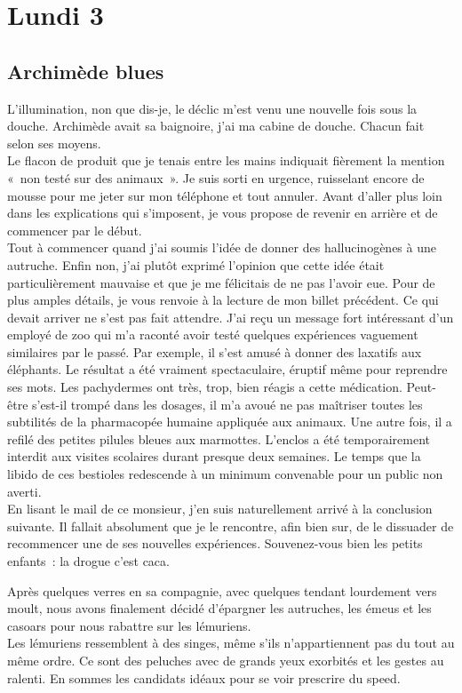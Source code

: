﻿\section*{Lundi 3}
\subsection*{Archimède blues}
L’illumination, non que dis-je, le déclic m’est venu une nouvelle fois sous la douche. Archimède avait sa baignoire, j’ai ma cabine de douche. Chacun fait selon ses moyens.\\
Le flacon de produit que je tenais entre les mains indiquait fièrement la mention « non testé sur des animaux ». Je suis sorti en urgence, ruisselant encore de mousse pour me jeter sur mon téléphone et tout annuler. Avant d’aller plus loin dans les explications qui s’imposent, je vous propose de revenir en arrière et de commencer par le début. \\
Tout à commencer quand j’ai soumis l’idée de donner des hallucinogènes à une autruche. Enfin non, j’ai plutôt exprimé l’opinion que cette idée était particulièrement mauvaise et que je me félicitais de ne pas l’avoir eue. Pour de plus amples détails, je vous renvoie à la lecture de mon billet précédent. Ce qui devait arriver ne s’est pas fait attendre. J’ai reçu un message fort intéressant d’un employé de zoo qui m’a raconté avoir testé quelques expériences vaguement similaires par le passé. Par exemple, il s’est amusé à donner des laxatifs aux éléphants. Le résultat a été vraiment spectaculaire, éruptif même pour reprendre ses mots. Les pachydermes ont très, trop, bien réagis a cette médication. Peut-être s’est-il trompé dans les dosages, il m’a avoué ne pas maîtriser toutes les subtilités de la pharmacopée humaine appliquée aux animaux. Une autre fois, il a refilé des petites pilules bleues aux marmottes. L’enclos a été temporairement interdit aux visites scolaires durant presque deux semaines. Le temps que la libido de ces bestioles redescende à un minimum convenable pour un public non averti. \\
En lisant le mail de ce monsieur, j’en suis naturellement arrivé à la conclusion suivante. Il fallait absolument que je le rencontre, afin bien sur, de le dissuader de recommencer une de ses nouvelles expériences. Souvenez-vous bien les petits enfants : la drogue c’est caca. 

Après quelques verres en sa compagnie, avec quelques tendant lourdement vers moult, nous avons finalement décidé d’épargner les autruches, les émeus et les casoars pour nous rabattre sur les lémuriens.\\
Les lémuriens ressemblent à des singes, même s’ils n’appartiennent pas du tout au même ordre. Ce sont des peluches avec de grands yeux exorbités et les gestes au ralenti. En sommes les candidats idéaux pour se voir prescrire du speed.


